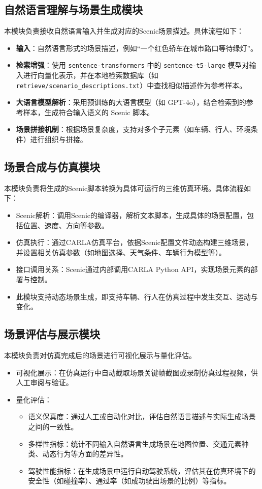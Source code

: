 \subsection{自然语言理解与场景生成模块}
本模块负责接收自然语言输入并生成对应的Scenic场景描述。具体流程如下：
\begin{itemize}
	\item \textbf{输入}：自然语言形式的场景描述，例如“一个红色轿车在城市路口等待绿灯”。
	\item \textbf{检索增强}：使用 \texttt{sentence-transformers} 中的 \texttt{sentence-t5-large} 模型对输入进行向量化表示，并在本地检索数据库（如 \texttt{retrieve/scenario\_descriptions.txt}）中查找相似描述作为参考样本。
	\item \textbf{大语言模型解析}：采用预训练的大语言模型（如 GPT-4o），结合检索到的参考样本，生成符合输入语义的 Scenic 脚本。
	\item \textbf{场景拼接机制}：根据场景复杂度，支持对多个子元素（如车辆、行人、环境条件）进行组织与拼接。
\end{itemize}


\subsection{场景合成与仿真模块}
本模块负责将生成的Scenic脚本转换为具体可运行的三维仿真环境。具体流程如下：
\begin{itemize}
	\item Scenic解析：调用Scenic的编译器，解析文本脚本，生成具体的场景配置，包括位置、速度、方向等参数。
	\item 仿真执行：通过CARLA仿真平台，依据Scenic配置文件动态构建三维场景，并设置相关仿真参数（如地图选择、天气条件、车辆行为模型等）。
	\item 接口调用关系：Scenic通过内部调用CARLA Python API，实现场景元素的部署与控制。
	\item 此模块支持动态场景生成，即支持车辆、行人在仿真过程中发生交互、运动与变化。
\end{itemize}

\subsection{场景评估与展示模块}
本模块负责对仿真完成后的场景进行可视化展示与量化评估。
\begin{itemize}
	\item 可视化展示：在仿真运行中自动截取场景关键帧截图或录制仿真过程视频，供人工审阅与验证。
	\item 量化评估：
	\begin{itemize}
		\item 语义保真度：通过人工或自动化对比，评估自然语言描述与实际生成场景之间的一致性。
		\item 多样性指标：统计不同输入自然语言生成场景在地图位置、交通元素种类、动态行为等方面的差异性。
		\item 驾驶性能指标：在生成场景中运行自动驾驶系统，评估其在仿真环境下的安全性（如碰撞率）、通过率（如成功驶出场景的比例）等指标。
	\end{itemize}
\end{itemize}
